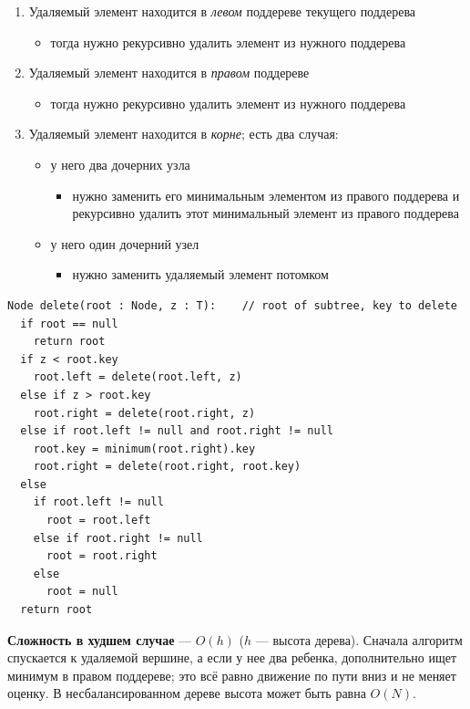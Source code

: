 \documentclass[a4paper]{article}
\begin{document}
\begin{enumerate}
    \item Удаляемый элемент находится в \textit{левом} поддереве текущего поддерева
    \begin{itemize}
        \item тогда нужно рекурсивно удалить элемент из нужного поддерева
    \end{itemize}
    \item Удаляемый элемент находится в \textit{правом} поддереве
    \begin{itemize}
        \item тогда нужно рекурсивно удалить элемент из нужного поддерева
    \end{itemize}
    \item Удаляемый элемент находится в \textit{корне}; есть два случая:
    \begin{itemize}
        \item у него два дочерних узла
        \begin{itemize}
            \item нужно заменить его минимальным элементом из правого поддерева и рекурсивно удалить этот минимальный элемент из правого поддерева
        \end{itemize}
        \item у него один дочерний узел
        \begin{itemize}
            \item нужно заменить удаляемый элемент потомком
        \end{itemize}
    \end{itemize}
\end{enumerate}

\begin{lstlisting}
Node delete(root : Node, z : T):    // root of subtree, key to delete
  if root == null
    return root
  if z < root.key
    root.left = delete(root.left, z)
  else if z > root.key
    root.right = delete(root.right, z)
  else if root.left != null and root.right != null
    root.key = minimum(root.right).key
    root.right = delete(root.right, root.key)
  else
    if root.left != null
      root = root.left
    else if root.right != null
      root = root.right
    else
      root = null
  return root
\end{lstlisting}

\textbf{Сложность в худшем случае} — $O(h)$ ($h$ — высота дерева). Сначала алгоритм спускается к удаляемой вершине, а если у нее два ребенка, дополнительно ищет минимум в правом поддереве; это всё равно движение по пути вниз и не меняет оценку. В несбалансированном дереве высота может быть равна $O(N)$.
\end{document}
